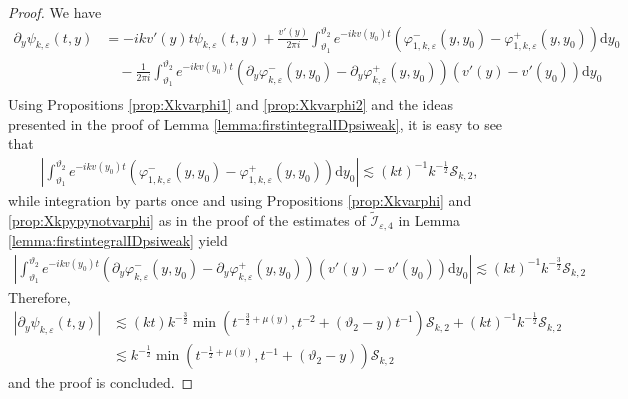 \documentclass[11pt,reqno]{amsproc}
\theoremstyle{definition}
\numberwithin{equation}{section}
\newcommand{\cI}{{\mathcal I}}
\newcommand{\cS}{{\mathcal S}}
\renewcommand{\d}{\mathrm{d}}
\newcommand{\ep}{\varepsilon}
\begin{document}
\begin{proof}
We have
\begin{align*}
\partial_y \psi_{k,\ep}(t,y) &= -ikv'(y)t \psi_{k,\ep}(t,y) + \frac{v'(y)}{2\pi i}\int_{\vartheta_1}^{\vartheta_2} e^{-ikv(y_0)t}\left( \varphi_{1,k,\ep}^-(y,y_0) - \varphi_{1,k,\ep}^+(y,y_0) \right) \d y_0 \\
&\quad -\frac{1}{2\pi i} \int_{\vartheta_1}^{\vartheta_2} e^{-ikv(y_0)t}\left( \partial_y\varphi_{k,\ep}^-(y,y_0) - \partial_y\varphi_{k,\ep}^+(y,y_0) \right)(v'(y) - v'(y_0)) \d y_0 \\
\end{align*}
Using Propositions \ref{prop:Xkvarphi1} and \ref{prop:Xkvarphi2} and the ideas presented in the proof of Lemma \ref{lemma:firstintegralIDpsiweak}, it is easy to see that 
\begin{align*}
\left| \int_{\vartheta_1}^{\vartheta_2} e^{-ikv(y_0)t}\left( \varphi_{1,k,\ep}^-(y,y_0) - \varphi_{1,k,\ep}^+(y,y_0) \right) \d y_0 \right| \lesssim (kt)^{-1}k^{-\frac12}\cS_{k,2},
\end{align*}
while integration by parts once and using Propositions \ref{prop:Xkvarphi} and \ref{prop:Xkpypynotvarphi} as in the proof of the estimates of $\widetilde\cI_{\ep,4}$ in Lemma \ref{lemma:firstintegralIDpsiweak} yield 
\begin{align*}
\left| \int_{\vartheta_1}^{\vartheta_2} e^{-ikv(y_0)t}\left( \partial_y\varphi_{k,\ep}^-(y,y_0) - \partial_y\varphi_{k,\ep}^+(y,y_0) \right)(v'(y) - v'(y_0)) \d y_0 \right| \lesssim (kt)^{-1}k^{-\frac32}\cS_{k,2}
\end{align*}
Therefore,
\begin{align*}
\left| \partial_y\psi_{k,\ep}(t,y) \right| &\lesssim (kt) k^{-\frac32}\min \left( t^{-\frac32+\mu(y)}, t^{-2} + (\vartheta_2-y)t^{-1} \right)\cS_{k,2} + (kt)^{-1} k^{-\frac12}\cS_{k,2} \\
&\lesssim k^{-\frac12}\min \left( t^{-\frac12+\mu(y)}, t^{-1} + (\vartheta_2-y) \right) \cS_{k,2}
\end{align*}
and the proof is concluded.
\end{proof}
\end{document}
